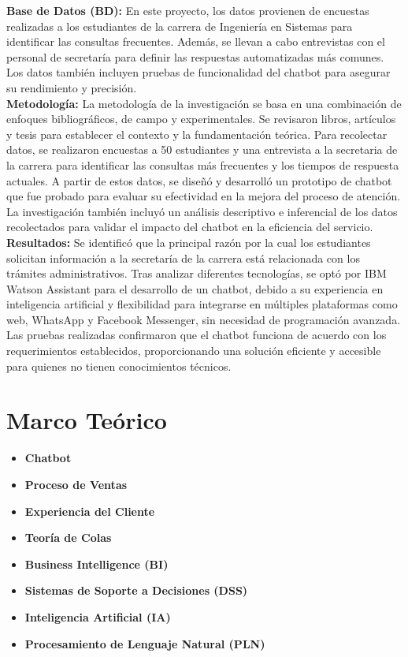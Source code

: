 \documentclass[10pt,a4paper]{article}
\begin{document}
\textbf{Base de Datos (BD):} En este proyecto, los datos provienen de encuestas realizadas a los estudiantes de la carrera de Ingeniería en Sistemas para identificar las consultas frecuentes. Además, se llevan a cabo entrevistas con el personal de secretaría para definir las respuestas automatizadas más comunes. Los datos también incluyen pruebas de funcionalidad del chatbot para asegurar su rendimiento y precisión. \\

\textbf{Metodología:} La metodología de la investigación se basa en una combinación de enfoques bibliográficos, de campo y experimentales. Se revisaron libros, artículos y tesis para establecer el contexto y la fundamentación teórica. Para recolectar datos, se realizaron encuestas a 50 estudiantes y una entrevista a la secretaria de la carrera para identificar las consultas más frecuentes y los tiempos de respuesta actuales. A partir de estos datos, se diseñó y desarrolló un prototipo de chatbot que fue probado para evaluar su efectividad en la mejora del proceso de atención. La investigación también incluyó un análisis descriptivo e inferencial de los datos recolectados para validar el impacto del chatbot en la eficiencia del servicio. \\

\textbf{Resultados:} Se identificó que la principal razón por la cual los estudiantes solicitan información a la secretaría de la carrera está relacionada con los trámites administrativos. Tras analizar diferentes tecnologías, se optó por IBM Watson Assistant para el desarrollo de un chatbot, debido a su experiencia en inteligencia artificial y flexibilidad para integrarse en múltiples plataformas como web, WhatsApp y Facebook Messenger, sin necesidad de programación avanzada. Las pruebas realizadas confirmaron que el chatbot funciona de acuerdo con los requerimientos establecidos, proporcionando una solución eficiente y accesible para quienes no tienen conocimientos técnicos. \\


\section{Marco Teórico}

\begin{itemize}
    \item \textbf{Chatbot}
    \item \textbf{Proceso de Ventas}
    \item \textbf{Experiencia del Cliente}
    \item \textbf{Teoría de Colas}
    \item \textbf{Business Intelligence (BI)}
    \item \textbf{Sistemas de Soporte a Decisiones (DSS)}
    \item \textbf{Inteligencia Artificial (IA)}
    \item \textbf{Procesamiento de Lenguaje Natural (PLN)}
\end{itemize}
	
\end{document}

